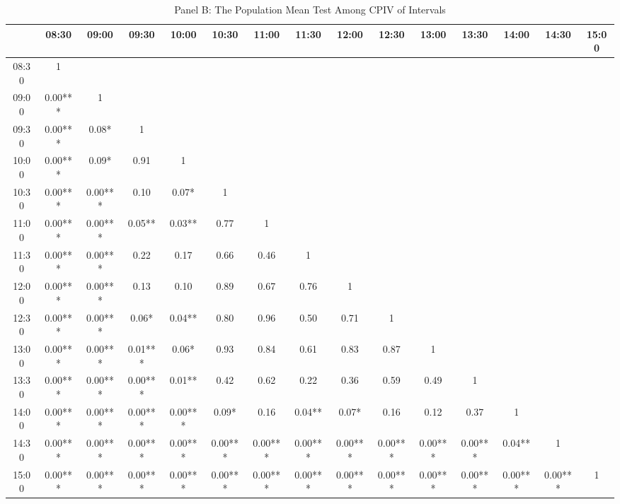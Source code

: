 \begin{table}[h]
\begin{threeparttable}
\medskip

\begin{subtable}[t]{\linewidth}

\caption{Panel B: The Population Mean Test Among CPIV of Intervals}
\tiny

\begin{tabular}{|c|cccccccccccccc}
\toprule

& 08:30   & 09:00   & 09:30   & 10:00   & 10:30   & 11:00   & 11:30   & 12:00   & 12:30   & 13:00   & 13:30   & 14:00  & 14:30 & 15:00 \\ \midrule
08:30 & 1       &         &         &         &         &         &         &         &         &         &         &        &       &       \\
09:00 & 0.00*** & 1       &         &         &         &         &         &         &         &         &         &        &       &       \\
09:30 & 0.00*** & 0.08*   & 1       &         &         &         &         &         &         &         &         &        &       &       \\
10:00 & 0.00*** & 0.09*   & 0.91    & 1       &         &         &         &         &         &         &         &        &       &       \\
10:30 & 0.00*** & 0.00*** & 0.10    & 0.07*   & 1       &         &         &         &         &         &         &        &       &       \\
11:00 & 0.00*** & 0.00*** & 0.05**  & 0.03**  & 0.77    & 1       &         &         &         &         &         &        &       &       \\
11:30 & 0.00*** & 0.00*** & 0.22    & 0.17    & 0.66    & 0.46    & 1       &         &         &         &         &        &       &       \\
12:00 & 0.00*** & 0.00*** & 0.13    & 0.10    & 0.89    & 0.67    & 0.76    & 1       &         &         &         &        &       &       \\
12:30 & 0.00*** & 0.00*** & 0.06*   & 0.04**  & 0.80    & 0.96    & 0.50    & 0.71    & 1       &         &         &        &       &       \\
13:00 & 0.00*** & 0.00*** & 0.01*** & 0.06*   & 0.93    & 0.84    & 0.61    & 0.83    & 0.87    & 1       &         &        &       &       \\
13:30 & 0.00*** & 0.00*** & 0.00*** & 0.01**  & 0.42    & 0.62    & 0.22    & 0.36    & 0.59    & 0.49    & 1       &        &       &       \\
14:00 & 0.00*** & 0.00*** & 0.00*** & 0.00*** & 0.09*   & 0.16    & 0.04**  & 0.07*   & 0.16    & 0.12    & 0.37    & 1      &       &       \\
14:30 & 0.00*** & 0.00*** & 0.00*** & 0.00*** & 0.00*** & 0.00*** & 0.00*** & 0.00*** & 0.00*** & 0.00*** & 0.00*** & 0.04** & 1     &       \\
15:00 & 0.00*** & 0.00*** & 0.00*** & 0.00*** & 0.00*** & 0.00*** & 0.00*** & 0.00*** & 0.00*** & 0.00*** & 0.00*** & 0.00*** & 0.00***& 1   \\
\bottomrule


\end{tabular}
\end{subtable}
\end{threeparttable}
\end{table}
